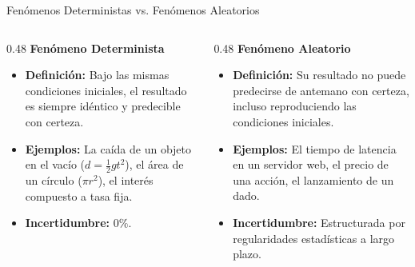 \documentclass[10pt,aspectratio=169]{beamer}
\begin{document}
\begin{frame}{Fenómenos Deterministas vs. Fenómenos Aleatorios}
  \begin{columns}[T]
    \begin{column}{0.48\textwidth}
      {\large \color{TecAzulOscuro}\textbf{Fenómeno Determinista}}
      \vspace{0.3em}
      \begin{itemize}
        \item \textbf{Definición:} Bajo las mismas condiciones iniciales, el resultado es siempre idéntico y predecible con certeza. \pause
        \item \textbf{Ejemplos:} La caída de un objeto en el vacío ($d = \frac{1}{2}gt^2$), el área de un círculo ($\pi r^2$), el interés compuesto a tasa fija. \pause
        \item \textbf{Incertidumbre:} $0\%$.
      \end{itemize}
    \end{column}
    
    \begin{column}{0.48\textwidth}
      {\large \color{TecRojo}\textbf{Fenómeno Aleatorio}}
      \vspace{0.3em}
      \begin{itemize}
        \item \textbf{Definición:} Su resultado no puede predecirse de antemano con certeza, incluso reproduciendo las condiciones iniciales. \pause
        \item \textbf{Ejemplos:} El tiempo de latencia en un servidor web, el precio de una acción, el lanzamiento de un dado. \pause
        \item \textbf{Incertidumbre:} Estructurada por regularidades estadísticas a largo plazo.
      \end{itemize}
    \end{column}
  \end{columns}
\end{frame}
\end{document}
